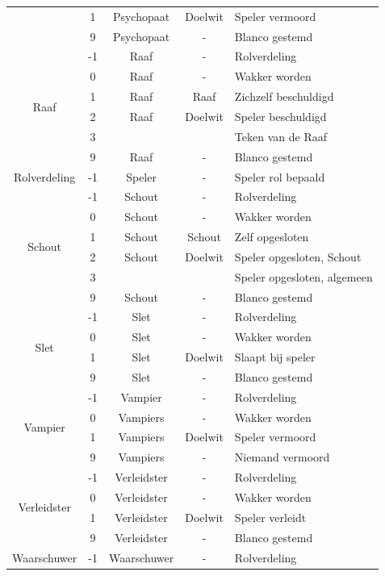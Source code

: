 \documentclass[12pt]{article}
\begin{document}
\begin{center}
\begin{longtable}{c|c|c|c|l}
       & 1 & Psychopaat & Doelwit & Speler vermoord \\
       & 9 & Psychopaat & - & Blanco gestemd \\
      \hline
      \multirow{6}{*}{Raaf} & -1 & Raaf & - & Rolverdeling \\
       & 0 & Raaf & - & Wakker worden \\
       & 1 & Raaf & Raaf & Zichzelf beschuldigd \\
       & 2 & Raaf & Doelwit & Speler beschuldigd \\
       & 3 & & & Teken van de Raaf \\
       & 9 & Raaf & - & Blanco gestemd \\
      \hline
      \multirow{1}{*}{Rolverdeling} & -1 & Speler & - & Speler rol bepaald \\
      \hline
      \multirow{6}{*}{Schout} & -1 & Schout & - & Rolverdeling \\
       & 0 & Schout & - & Wakker worden \\
       & 1 & Schout & Schout & Zelf opgesloten \\
       & 2 & Schout & Doelwit & Speler opgesloten, Schout \\
       & 3 & & & Speler opgesloten, algemeen \\
       & 9 & Schout & - & Blanco gestemd \\
      \hline
      \multirow{4}{*}{Slet} & -1 & Slet & - & Rolverdeling \\
       & 0 & Slet & - & Wakker worden \\
       & 1 & Slet & Doelwit & Slaapt bij speler \\
       & 9 & Slet & - & Blanco gestemd \\
      \hline
      \multirow{4}{*}{Vampier} & -1 & Vampier & - & Rolverdeling \\
       & 0 & Vampiers & - & Wakker worden \\
       & 1 & Vampiers & Doelwit & Speler vermoord \\
       & 9 & Vampiers & - & Niemand vermoord \\
      \hline
      \multirow{4}{*}{Verleidster} & -1 & Verleidster & - & Rolverdeling \\
       & 0 & Verleidster & - & Wakker worden \\
       & 1 & Verleidster & Doelwit & Speler verleidt \\
       & 9 & Verleidster & - & Blanco gestemd \\
      \hline
      \multirow{5}{*}{Waarschuwer} & -1 & Waarschuwer & - & Rolverdeling \\

\end{longtable}
\end{center}
\end{document}
